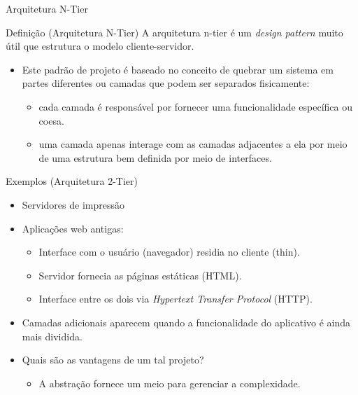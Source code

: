 \begin{frame}{Arquitetura N-Tier}
  \begin{exampleblock}{Definição (Arquitetura N-Tier)}
    A arquitetura n-tier é um \textit{design pattern} muito útil que estrutura o modelo cliente-servidor.
  \end{exampleblock}
  \begin{itemize}
    \item Este padrão de projeto é baseado no conceito de \alert{quebrar} um sistema em partes diferentes ou 
      camadas que podem ser separados fisicamente:
    \begin{itemize}
      \item cada camada é responsável por fornecer uma \alert{funcionalidade específica} ou coesa. 
      \item uma camada apenas interage com as \alert{camadas adjacentes} a ela por meio de uma 
	\alert{estrutura} bem definida por meio de \alert{interfaces}.
    \end{itemize}
  \end{itemize}
  \begin{exampleblock}{Exemplos (Arquitetura 2-Tier)}
    \begin{itemize}
      \item Servidores de impressão
      \item Aplicações web antigas:
      \begin{itemize}
        \item Interface com o usuário (navegador) residia no cliente (thin). 
        \item Servidor fornecia as páginas estáticas (HTML). 
        \item Interface entre os dois via \textit{Hypertext Transfer Protocol} (HTTP).
      \end{itemize}
    \end{itemize}
  \end{exampleblock}
  \begin{itemize}
    \item Camadas \alert{adicionais} aparecem quando a \alert{funcionalidade} do aplicativo é ainda 
      \alert{mais dividida}.
    \item Quais são as vantagens de um tal projeto? 
    \begin{itemize}
      \item A abstração fornece um meio para \alert{gerenciar} a complexidade. 

\end{itemize}
\end{itemize}
\end{frame}
